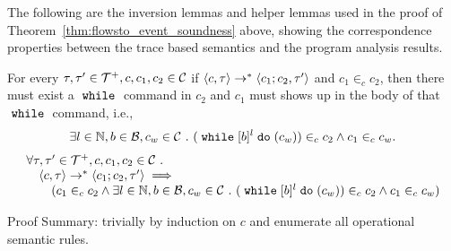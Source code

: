 The following are the inversion lemmas and helper lemmas used in the proof of Theorem~\ref{thm:flowsto_event_soundness} above,
showing the correspondence properties between the trace based semantics and the program analysis results.
%

%
\begin{lem}
	\label{lem:inv_while}
	For every $\mathtt{\tau}, \mathtt{\tau}' \in \mathcal{T}^{+}, c, c_1, c_2 \in \mathcal{C}$ 
	if $ \langle c, \mathtt{\tau} \rangle \rightarrow^* \langle c_1; c_2, \mathtt{\tau}' \rangle$ and 
	$c_1 \in_c c_2$, 
	then there must exist a $\;\mathtt{while}\;$ command in $c_2$ and $c_1$ must shows up in the body of that $\;\mathtt{while}\;$ command,
	 i.e., 
	 $$\exists l \in \mathbb{N}, b \in \mathcal{B}, c_w \in \mathcal{C} ~.~  
	(\;\mathtt{while}\; [b]^l \;\mathtt{do}\; (c_w)) \in_c c_2 \land c_1 \in_c c_w.$$
	\[
	\begin{array}{l}
	\forall \mathtt{\tau}, \mathtt{\tau}' \in \mathcal{T}^{+}, c, c_1, c_2 \in \mathcal{C} ~.~ 
		\\ \quad
		\langle c, \mathtt{\tau} \rangle \rightarrow^* \langle c_1; c_2, \mathtt{\tau}' \rangle
		\implies
		\\ \qquad
		(c_1 \in_c c_2
		\land
		\exists l \in \mathbb{N}, b \in \mathcal{B}, c_w \in \mathcal{C} ~.~  
		(\;\mathtt{while}\; [b]^l \;\mathtt{do}\; (c_w)) \in_c c_2 \land c_1 \in_c c_w)
	\end{array}
	\]
	\end{lem}	
	Proof Summary: trivially by induction on $c$ and enumerate all operational semantic rules.
